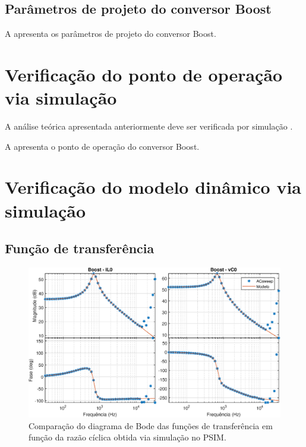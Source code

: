 \subsection{Parâmetros de projeto do conversor Boost}


A  apresenta os parâmetros de projeto do conversor Boost.




\section{Verificação do ponto de operação via simulação}

A análise teórica apresentada anteriormente deve ser verificada por simulação \cite{noauthor_psim_nodate}.

A  apresenta o ponto de operação do conversor Boost.









\section{Verificação do modelo dinâmico via simulação}

\subsection{Função de transferência}


\begin{figure}[!ht]
	\centering
	\includegraphics[width=1\linewidth]{Figs/Boost-ValidacaoModelo}
	\caption{Comparação do diagrama de Bode das funções de transferência em função da razão cíclica obtida via simulação no PSIM.}
	\label{fig:ValidacaoModelo}
\end{figure}



